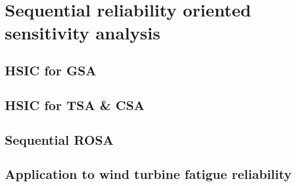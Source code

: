 \chapter{Sequential reliability oriented sensitivity analysis}
    \section{HSIC for GSA}
    \section{HSIC for TSA \& CSA}
    \section{Sequential ROSA}
    \section{Application to wind turbine fatigue reliability}